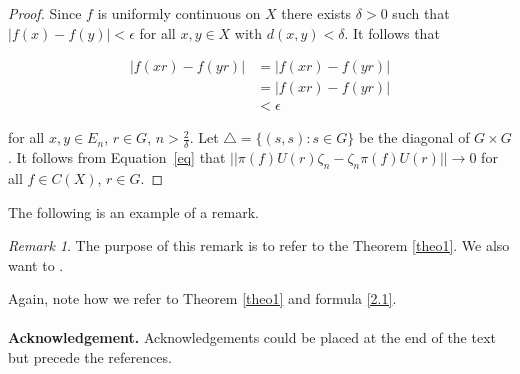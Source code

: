 \documentclass[12pt, reqno]{amsart}
\theoremstyle{definition}
\theoremstyle{remark}
\newtheorem{remark}[theorem]{Remark}
\numberwithin{equation}{section}
\begin{document}

\begin{proof}
Since $f$ is uniformly continuous on $X$ there exists $\delta>0$ such that $|f(x)-f(y)|<\epsilon$ for all $x,y\in X$ with $d(x,y)<\delta$. It follows that

\begin{align}\label{eq}
|f(xr)-f(yr)|&=|f(xr)-f(yr)|\nonumber\\
&=|f(xr)-f(yr)|\nonumber\\
&< \epsilon
\end{align}



for all $x,y\in E_n$, $r\in G$, $n>\frac{2}{\delta}$. Let $\bigtriangleup = \{(s, s): s\in G\}$ be the diagonal of $G\times G$. It follows from Equation~\eqref{eq} that  $||\pi(f)U(r)\zeta_n-\zeta_n\pi(f)U(r)||\rightarrow 0$ for all $f\in C(X)$, $r\in G$.
\end{proof}


The following is an example of a remark.


\begin{remark}
The purpose of this remark is to refer to the Theorem
\ref{theo1}. We also want to \cite{Brown, Connes}. 
\end{remark}


Again, note how we refer to Theorem \ref{theo1} and formula \eqref{2.1}.
\\
\\
{\bf Acknowledgement.} Acknowledgements could be placed at the end
of the text but precede the references.
\end{document}
